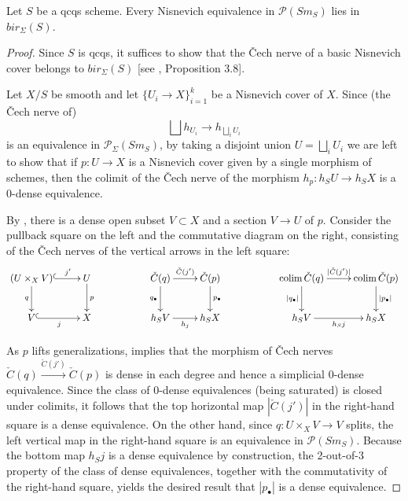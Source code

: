 \begin{thm}\label{nis is bir}
    Let $S$ be a qcqs scheme. Every Nisnevich equivalence in $\mathcal{P}(Sm_S)$ lies in $bir_\Sigma(S)$.
\end{thm}
\begin{proof}
Since $S$ is qcqs, it suffices to show that the \v{C}ech nerve of a basic Nisnevich cover belongs to $bir_\Sigma(S)$ [see \cite{hoyois2017six}, Proposition 3.8]. 

Let $X/S$ be smooth and let $\{U_i\to X\}_{i=1}^{k}$ be a Nisnevich cover of $X$. Since (the \v Cech nerve of) $$\bigsqcup h_{U_i}\to h_{\bigsqcup _iU_i}$$ is an equivalence in $ \mathcal{P}_\Sigma(Sm_S)$, by taking a disjoint union $U=\bigsqcup_i U_i$ we are left to show that if $p:U\to X$ is a Nisnevich cover given by a single morphism of schemes, then the colimit of the \v{C}ech nerve of the morphism $h_p:h_SU\to h_SX$ is a $0$-dense equivalence.
    
  By , there is a dense open subset $V\subset X$ and a section $V\to U$ of $p$. Consider the pullback square on the left and the commutative diagram on the right, consisting of the \v{C}ech nerves of the vertical arrows in the left square:
  \[\xymatrix{
  (U\times_XV) \ar@{^(->}[r]^-{j'}\ar[d]_{q} &U\ar[d]^{p}&&  \check{C}(q) \ar[r]^-{\check{C}(j')}\ar[d]_{q_\bullet} &\check{C} (p)\ar[d]^{p_\bullet}&&\colim\check{C}(q) \ar[r]^-{|\check{C}(j')|}\ar[d]_{|q_\bullet|} &\colim \check{C} (p)\ar[d]^{|p_\bullet|}\\
 V\ar@{^(->}[r]_{j}& X&&  h_SV\ar[r]_{h_j}& h_SX&&  h_SV\ar[r]_{h_Sj}& h_SX
  }\]
  
  As $p$ lifts generalizations,  implies that the morphism of \v{C}ech nerves $\check{C}(q) \xrightarrow{\check{C}(j')}\check{C} (p)$ is dense in each degree and hence a simplicial $0$-dense equivalence. Since the class of $0$-dense equivalences (being saturated) is closed under colimits, it follows that the top horizontal map $|\check{C}(j')| $ in the right-hand square is a dense equivalence. On the other hand, since $q:U\times_XV\to V$ splits, the left vertical map in the right-hand square is an equivalence in $\mathcal{P}(Sm_S)$. Because the bottom map $h_Sj$ is a dense equivalence by construction, the 2-out-of-3 property of the class of dense equivalences, together with the commutativity of the right-hand square, yields the desired result that $|p_\bullet|$ is a dense equivalence.
\end{proof}  


